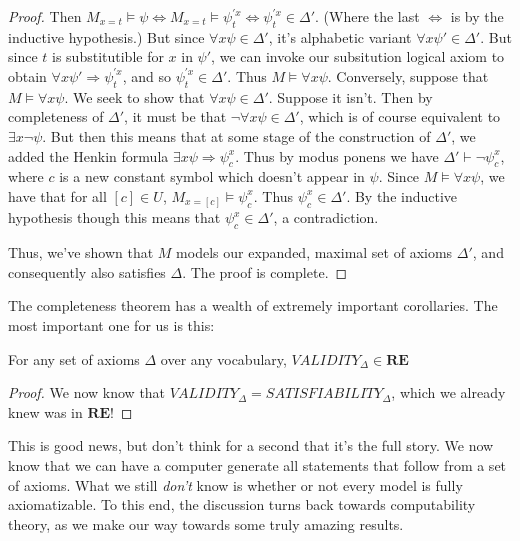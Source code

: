 \begin{proof}
    Then $M_{x = t} \models \psi \iff M_{x = t} \models \psi_t^{'x} \iff \psi_t^{'x} \in \Delta'$. (Where the last $\iff$ is by the inductive hypothesis.) 
    But since $\forall x \psi \in \Delta'$, it's alphabetic variant $\forall x \psi' \in \Delta'$. But since $t$ is substitutible for $x$ in $\psi'$, we can invoke our subsitution logical axiom to obtain $\forall x \psi' \Rightarrow \psi_t^{'x}$, and so $\psi_t^{'x} \in \Delta'$. Thus $M \models \forall x \psi$. 
    Conversely, suppose that $M \models \forall x \psi$. We seek to show that $\forall x \psi \in \Delta'$. Suppose it isn't. Then by completeness of $\Delta'$, it must be that $\neg \forall x \psi \in \Delta'$, which is of course equivalent to $\exists x \neg \psi$. But then this means that at some stage of the construction of $\Delta'$, we added the Henkin formula $\exists x \psi \Rightarrow \psi_c^x$. Thus by modus ponens we have $\Delta' \vdash \neg \psi_c^x$, where $c$ is a new constant symbol which doesn't appear in $\psi$. Since $M \models \forall x \psi$, we have that for all $[c] \in U$, $M_{x = [c]} \models \psi_c^x$. Thus $\psi_c^x \in \Delta'$. By the inductive hypothesis though this means that $\psi_c^x \in \Delta'$, a contradiction.  
    \par Thus, we've shown that $M$ models our expanded, maximal set of axioms $\Delta'$, and consequently also satisfies $\Delta$. The proof is complete.
\end{proof}
The completeness theorem has a wealth of extremely important corollaries. The most important one for us is this:
\begin{corollary}
    For any set of axioms $\Delta$ over any vocabulary, $VALIDITY_{\Delta} \in \textbf{RE}$ 
\end{corollary}
\begin{proof}
    We now know that $VALIDITY_{\Delta} = SATISFIABILITY_{\Delta}$, which we already knew was in $\textbf{RE}$!
\end{proof}
This is good news, but don't think for a second that it's the full story. We now know that we can have a computer generate all statements that follow from a set of axioms. What we still \textit{don't} know is whether or not every model is fully axiomatizable. To this end, the discussion turns back towards computability theory, as we make our way towards some truly amazing results. 
